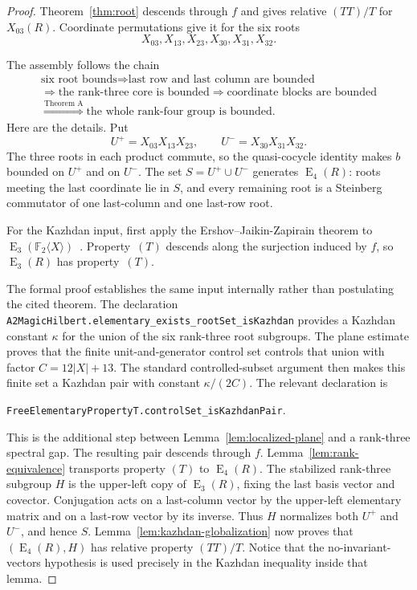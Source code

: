 \documentclass[11pt]{amsart}
\theoremstyle{definition}
\theoremstyle{plain}
\newcommand{\F}{\mathbb F}
\newcommand{\EL}{\operatorname{E}}
\begin{document}
\begin{proof}
Theorem~\ref{thm:root} descends through \(f\) and gives relative
\((TT)/T\) for \(X_{03}(R)\).  Coordinate permutations give it for
the six roots
\[
  X_{03},X_{13},X_{23},X_{30},X_{31},X_{32}.
\]

The assembly follows the chain
\[
 \boxed{
 \begin{gathered}
   \text{six root bounds}
   \Longrightarrow \text{last row and last column are bounded}\\
   \Longrightarrow \text{the rank-three core is bounded}
   \Longrightarrow \text{coordinate blocks are bounded}\\
   \overset{\text{Theorem A}}{\Longrightarrow}
   \text{the whole rank-four group is bounded}.
 \end{gathered}}
\]
Here are the details.  Put
\[
  U^+=X_{03}X_{13}X_{23},
  \qquad U^-=X_{30}X_{31}X_{32}.
\]
The three roots in each product commute, so the quasi-cocycle
identity makes \(b\) bounded on \(U^+\) and on \(U^-\).  The set
\(S=U^+\cup U^-\) generates \(\EL_4(R)\): roots meeting the last
coordinate lie in \(S\), and every remaining root is a Steinberg
commutator of one last-column and one last-row root.

For the Kazhdan input, first apply the
Ershov--Jaikin-Zapirain theorem to
\(\EL_3(\F_2\langle X\rangle)\)~\cite{ErshovJaikin}.  Property~\((T)\)
descends along the surjection induced by \(f\), so \(\EL_3(R)\) has
property~\((T)\).

The formal proof establishes the same input internally rather than
postulating the cited theorem.  The declaration
\nolinkurl{A2MagicHilbert.elementary_exists_rootSet_isKazhdan}
provides a Kazhdan constant \(\kappa\) for the union of the six
rank-three root subgroups.  The plane estimate proves that the finite
unit-and-generator control set controls that union with factor
\(C=12\lvert X\rvert+13\).  The standard controlled-subset argument
then makes this finite set a Kazhdan pair with constant
\(\kappa/(2C)\).  The relevant declaration is
\begin{center}
\nolinkurl{FreeElementaryPropertyT.controlSet_isKazhdanPair}.
\end{center}
This is the additional step between Lemma~\ref{lem:localized-plane} and a
rank-three spectral gap.  The resulting pair descends through \(f\).
Lemma~\ref{lem:rank-equivalence} transports property
\((T)\) to \(\EL_4(R)\).  The stabilized rank-three subgroup
\(H\) is the upper-left copy of \(\EL_3(R)\), fixing the last basis
vector and covector.  Conjugation acts on a last-column vector by the
upper-left elementary matrix and on a last-row vector by its inverse.
Thus \(H\) normalizes both \(U^+\) and \(U^-\), and hence \(S\).
Lemma~\ref{lem:kazhdan-globalization} now proves that
\((\EL_4(R),H)\) has relative property \((TT)/T\).  Notice that the
no-invariant-vectors hypothesis is used precisely in the Kazhdan
inequality inside that lemma.


\end{proof}
\end{document}
